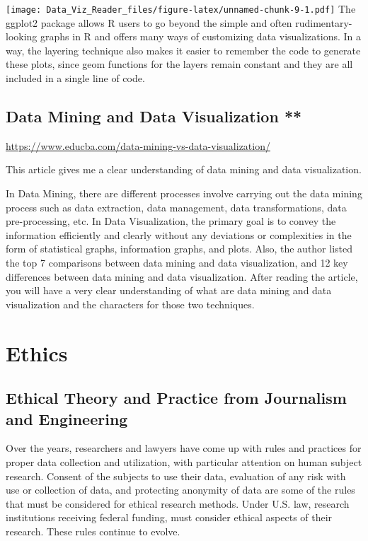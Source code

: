 \documentclass[]{book}
\theoremstyle{definition}
\theoremstyle{definition}
\theoremstyle{definition}
\theoremstyle{remark}
\begin{document}
\texttt{[image: Data\_Viz\_Reader\_files/figure-latex/unnamed-chunk-9-1.pdf]}
The ggplot2 package allows R users to go beyond the simple and often
rudimentary-looking graphs in R and offers many ways of customizing data
visualizations. In a way, the layering technique also makes it easier to
remember the code to generate these plots, since geom functions for the
layers remain constant and they are all included in a single line of
code.

\section{Data Mining and Data Visualization
**}\label{data-mining-and-data-visualization}

\url{https://www.educba.com/data-mining-vs-data-visualization/}

This article gives me a clear understanding of data mining and data
visualization.

In Data Mining, there are different processes involve carrying out the
data mining process such as data extraction, data management, data
transformations, data pre-processing, etc. In Data Visualization, the
primary goal is to convey the information efficiently and clearly
without any deviations or complexities in the form of statistical
graphs, information graphs, and plots. Also, the author listed the top 7
comparisons between data mining and data visualization, and 12 key
differences between data mining and data visualization. After reading
the article, you will have a very clear understanding of what are data
mining and data visualization and the characters for those two
techniques.

\chapter{Ethics}\label{ethics}

\section{Ethical Theory and Practice from Journalism and
Engineering}\label{ethical-theory-and-practice-from-journalism-and-engineering}

\citep{poli_social_science} Over the years, researchers and lawyers have
come up with rules and practices for proper data collection and
utilization, with particular attention on human subject research.
Consent of the subjects to use their data, evaluation of any risk with
use or collection of data, and protecting anonymity of data are some of
the rules that must be considered for ethical research methods. Under
U.S. law, research institutions receiving federal funding, must consider
ethical aspects of their research. These rules continue to evolve.
\end{document}
